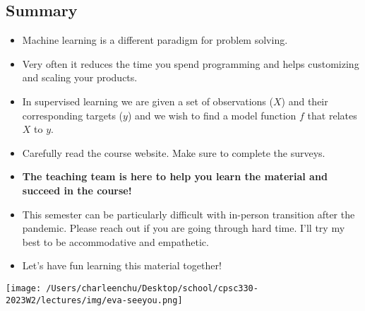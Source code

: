 \documentclass[11pt]{article}
\providecommand{\tightlist}{%
      \setlength{\itemsep}{0pt}\setlength{\parskip}{0pt}}
\begin{document}
    

    

    \subsection{Summary}\label{summary}

\begin{itemize}
\tightlist
\item
  Machine learning is a different paradigm for problem solving.\\
\item
  Very often it reduces the time you spend programming and helps
  customizing and scaling your products.
\item
  In supervised learning we are given a set of observations (\(X\)) and
  their corresponding targets (\(y\)) and we wish to find a model
  function \(f\) that relates \(X\) to \(y\).
\item
  Carefully read the course website. Make sure to complete the surveys.
\item
  \textbf{The teaching team is here to help you learn the material and
  succeed in the course!}
\item
  This semester can be particularly difficult with in-person transition
  after the pandemic. Please reach out if you are going through hard
  time. I'll try my best to be accommodative and empathetic.
\item
  Let's have fun learning this material together!
\end{itemize}

    \texttt{[image: /Users/charleenchu/Desktop/school/cpsc330-2023W2/lectures/img/eva-seeyou.png]}


    
    
    
\end{document}
